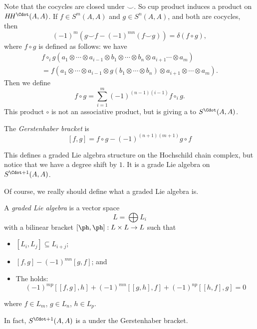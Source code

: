 \documentclass[a4paper]{article}
\newcommand\HH{H\!H}
\begin{document}
Note that the cocycles are closed under $\smile$. So cup product induces a product on $\HH^\Cdot(A, A)$. If $f \in S^m(A, A)$ and $g \in S^n(A, A)$, and both are cocycles, then
\[
  (-1)^m(g \smile f - (-1)^{mn} (f \smile g)) = \delta (f \circ g),
\]
where $f \circ g$ is defined as follows: we have
\begin{multline*}
  f \circ_i g (a_1 \otimes \cdots \otimes a_{i - 1} \otimes b_1 \otimes \cdots \otimes b_n \otimes a_{i + 1} \cdots \otimes a_m)\\
  = f(a_1 \otimes \cdots \otimes a_{i - 1} \otimes g(b_1 \otimes \cdots \otimes b_n) \otimes a_{i + 1} \otimes \cdots \otimes a_m).
\end{multline*}
Then we define
\[
  f \circ g = \sum_{i = 1}^m (-1)^{(n - 1)(i - 1)} f \circ_i g.
\]
This product $\circ$ is not an associative product, but is giving a  to $S^\Cdot (A, A)$.

\begin{defi}
  The \emph{Gerstenhaber bracket} is
  \[
    [f, g] = f \circ g - (-1)^{(n + 1)(m + 1)} g \circ f
  \]
\end{defi}
This defines a graded Lie algebra structure on the Hochschild chain complex, but notice that we have a degree shift by $1$. It is a grade Lie algebra on $S^{\Cdot + 1}(A, A)$.

Of course, we really should define what a graded Lie algebra is.
\begin{defi}
  A \emph{graded Lie algebra} is a vector space
  \[
    L = \bigoplus L_i
  \]
  with a bilinear bracket $[\ph,\ph] : L \times L \to L$ such that
  \begin{itemize}
    \item $[L_i, L_j] \subseteq L_{i + j}$;
    \item $[f, g] -(-1)^{mn} [g, f]$; and
    \item The  holds:
      \[
        (-1)^{mp} [[f, g], h] + (-1)^{mn} [[g, h], f] + (-1)^{np} [[h, f] ,g] = 0
      \]
  \end{itemize}
  where $f \in L_m$, $g \in L_n$, $h \in L_p$.
\end{defi}

In fact, $S^{\Cdot + 1}(A, A)$ is a  under the Gerstenhaber bracket.
\end{document}
